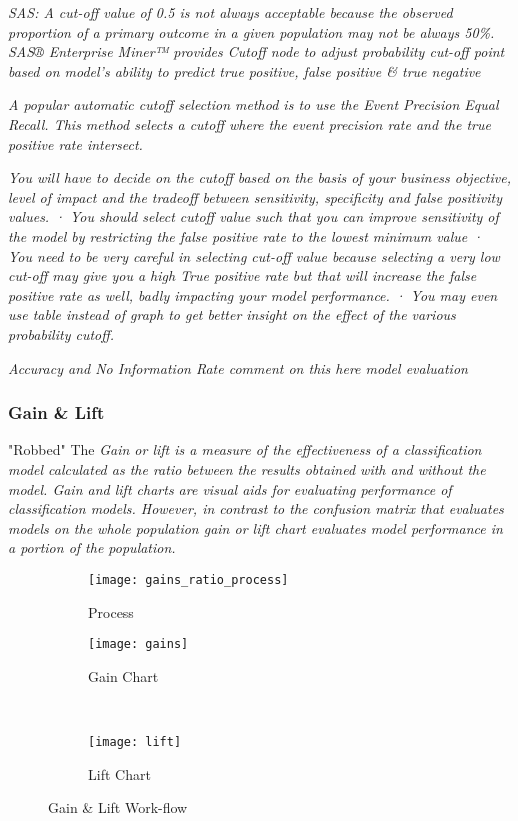 \textit{SAS: A cut-off value of 0.5 is not always acceptable because the observed proportion of a primary outcome in a given population may not be always 50\%. SAS® Enterprise Miner™ provides Cutoff node to adjust probability cut-off point based on model’s ability to predict true positive, false positive \& true negative}

\textit{
A popular automatic cutoff selection method is to use the Event Precision Equal Recall. This method selects a cutoff where the event precision rate and the true positive rate intersect.
}

\textit{ You will have to decide on the cutoff based on the basis of your business objective, level of impact and the tradeoff between sensitivity, specificity and false positivity values. · You should select cutoff value such that you can improve sensitivity of the model by restricting the false positive rate to the lowest minimum value · You need to be very careful in selecting cut-off value because selecting a very low cut-off may give you a high True positive rate but that will increase the false positive rate as well, badly impacting your model performance. · You may even use table instead of graph to get better insight on the effect of the various probability cutoff.}


\textit{Accuracy and No Information Rate comment on this here model evaluation}

\subsubsection{Gain \& Lift}
"Robbed" The
\textit{Gain or lift is a measure of the effectiveness of a classification model calculated as the ratio between the results obtained with and without the model. Gain and lift charts are visual aids for evaluating performance of classification models. However, in contrast to the confusion matrix that evaluates models on the whole population gain or lift chart evaluates model performance in a portion of the population. }

\begin{figure}[H]
	\centering
	\begin{subfigure}[b]{0.90\textwidth}
		\captionsetup{font=scriptsize}
		\texttt{[image: gains\_ratio\_process]}\caption{Process}\label{fig:gains_ratio_process}
	\end{subfigure} 
	\medskip
	\newline
	\begin{subfigure}[b]{0.45\textwidth}
		\captionsetup{font=scriptsize}
		\texttt{[image: gains]}
		\caption{Gain Chart}\label{fig:gains}
	\end{subfigure} ~\quad
	\begin{subfigure}[b]{0.45\textwidth}
		\captionsetup{font=scriptsize}
		\texttt{[image: lift]}
		\caption{Lift Chart}\label{fig:lift}
	\end{subfigure}
	\caption{Gain \& Lift Work-flow}
	\label{fig:unbal_corr_analysis}
\end{figure}

